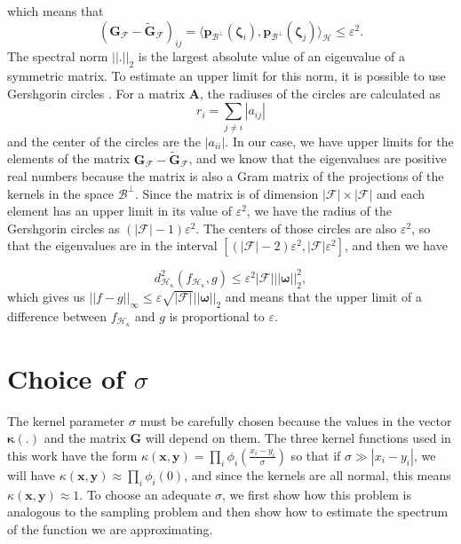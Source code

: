 which means that
\begin{equation}
    \left( \mathbf{G}_{\mathcal{F}} - \tilde{\mathbf{G}}_{\mathcal{F}}\right)_{ij} = \langle \mathbf{p}_{\mathcal{B}^\perp}(\boldsymbol{\zeta}_i),\mathbf{p}_{\mathcal{B}^\perp}(\boldsymbol{\zeta}_j)\rangle_{\mathcal{H}} \leq \varepsilon^2.
\end{equation}
The spectral norm $|| . ||_2$ is the largest absolute value of an eigenvalue of a symmetric matrix. To estimate an upper limit for this norm, it is possible to use Gershgorin circles \cite{meyer_matrix_2023}. For a matrix $\mathbf{A}$, the radiuses of the circles are calculated as 
\begin{equation}
    r_i = \sum_{j \neq i} |a_{ij}|
\end{equation}
and the center of the circles are the $|a_{ii}|$. In our case, we have upper limits for the elements of the matrix $ \mathbf{G}_{\mathcal{F}} - \tilde{\mathbf{G}}_{\mathcal{F}}$, and we know that the eigenvalues are positive real numbers because the matrix is also a Gram matrix of the projections of the kernels in the space $\mathcal{B}^{\perp}$. Since the matrix is of dimension $|\mathcal{F}|\times |\mathcal{F}|$ and each element has an upper limit in its value of $\varepsilon^2$, we have the radius of the Gershgorin circles as $(|\mathcal{F}| - 1)\varepsilon^2$. The centers of those circles are also $\varepsilon^2$, so that the eigenvalues are in the interval $\left[(|\mathcal{F}| - 2)\varepsilon^2,|\mathcal{F}|\varepsilon^2\right]$, and then we have

\begin{equation}
    d_{\mathcal{H}_{\kappa}}^2(f_{\mathcal{H}_\kappa},g)  \leq \varepsilon^2|\mathcal{F}| ||\boldsymbol{\omega}||^2_2,
\end{equation}
which gives us $||f-g||_{\infty} \leq \varepsilon\sqrt{|\mathcal{F}|} ||\boldsymbol{\omega}||_2$ and means that the upper limit of a difference between $f_{\mathcal{H}_\kappa}$ and $g$ is proportional to $\varepsilon$.

\section{Choice of $\sigma$}\label{sec:kernel_parameter}

The kernel parameter $\sigma$ must be carefully chosen because the values in the vector $\boldsymbol{\kappa}(.)$ and the matrix $\mathbf{G}$ will depend on them. The three kernel functions used in this work have the form $\kappa(\mathbf{x},\mathbf{y}) = \prod_i \phi_i\left(\frac{x_i - y_i}{\sigma}\right)$ so that if $\sigma \gg |x_i - y_i|$, we will have $\kappa(\mathbf{x},\mathbf{y}) \approx \prod_i\phi_i(0)$, and since the kernels are all normal, this means $\kappa(\mathbf{x},\mathbf{y}) \approx 1$. To choose an adequate $\sigma$, we first show how this problem is analogous to the sampling problem and then show how to estimate the spectrum of the function we are approximating.

